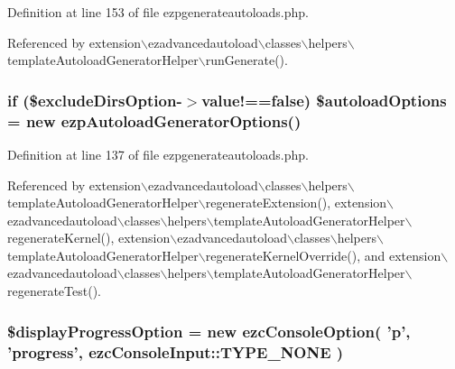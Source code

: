 \-Definition at line 153 of file ezpgenerateautoloads.\-php.



\-Referenced by extension$\backslash$ezadvancedautoload$\backslash$classes$\backslash$helpers$\backslash$template\-Autoload\-Generator\-Helper$\backslash$run\-Generate().

\hypertarget{ezpgenerateautoloads_8php_a11b2b8d92ed8fe93c2e53197e661142c}{
\subsubsection[{\$autoload\-Options}]{\setlength{\rightskip}{0pt plus 5cm}if (\$exclude\-Dirs\-Option-\/$>$value!==false) \$autoload\-Options = new ezp\-Autoload\-Generator\-Options()}}\label{ezpgenerateautoloads_8php_a11b2b8d92ed8fe93c2e53197e661142c}


\-Definition at line 137 of file ezpgenerateautoloads.\-php.



\-Referenced by extension$\backslash$ezadvancedautoload$\backslash$classes$\backslash$helpers$\backslash$template\-Autoload\-Generator\-Helper$\backslash$regenerate\-Extension(), extension$\backslash$ezadvancedautoload$\backslash$classes$\backslash$helpers$\backslash$template\-Autoload\-Generator\-Helper$\backslash$regenerate\-Kernel(), extension$\backslash$ezadvancedautoload$\backslash$classes$\backslash$helpers$\backslash$template\-Autoload\-Generator\-Helper$\backslash$regenerate\-Kernel\-Override(), and extension$\backslash$ezadvancedautoload$\backslash$classes$\backslash$helpers$\backslash$template\-Autoload\-Generator\-Helper$\backslash$regenerate\-Test().

\hypertarget{ezpgenerateautoloads_8php_a407bf0b4ef42d32212f29ac7c8e8a96e}{
\subsubsection[{\$display\-Progress\-Option}]{\setlength{\rightskip}{0pt plus 5cm}\$display\-Progress\-Option = new ezc\-Console\-Option( 'p', 'progress', ezc\-Console\-Input\-::\-T\-Y\-P\-E\-\_\-\-N\-O\-N\-E )}}\label{ezpgenerateautoloads_8php_a407bf0b4ef42d32212f29ac7c8e8a96e}


